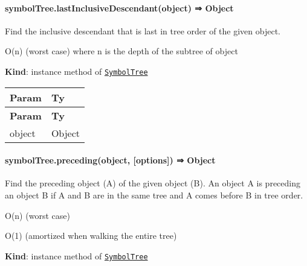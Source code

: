 \label{_module_symbol-tree--SymbolTree+lastInclusiveDescendant}%


\paragraph*{symbol\+Tree.\+last\+Inclusive\+Descendant(object) ⇒ {\ttfamily Object}}

Find the inclusive descendant that is last in tree order of the given object.


\begin{DoxyItemize}
\item {\ttfamily O(n)} (worst case) where {\ttfamily n} is the depth of the subtree of {\ttfamily object}
\end{DoxyItemize}

{\bfseries Kind}\+: instance method of {\ttfamily \href{#exp_module_symbol-tree--SymbolTree}{\tt Symbol\+Tree}}

\tabulinesep=1mm
\begin{longtabu} spread 0pt [c]{*{2}{|X[-1]}|}
\hline
\rowcolor{\tableheadbgcolor}\textbf{ Param  }&\textbf{ Ty   }\\
\endfirsthead
\hline
\endfoot
\hline
\rowcolor{\tableheadbgcolor}\textbf{ Param  }&\textbf{ Ty   }\\
\endhead
object  &{\ttfamily Object}   \\
\end{longtabu}


\label{_module_symbol-tree--SymbolTree+preceding}%


\paragraph*{symbol\+Tree.\+preceding(object, \mbox{[}options\mbox{]}) ⇒ {\ttfamily Object}}

Find the preceding object (A) of the given object (B). An object A is preceding an object B if A and B are in the same tree and A comes before B in tree order.


\begin{DoxyItemize}
\item {\ttfamily O(n)} (worst case)
\item {\ttfamily O(1)} (amortized when walking the entire tree)
\end{DoxyItemize}

{\bfseries Kind}\+: instance method of {\ttfamily \href{#exp_module_symbol-tree--SymbolTree}{\tt Symbol\+Tree}}


